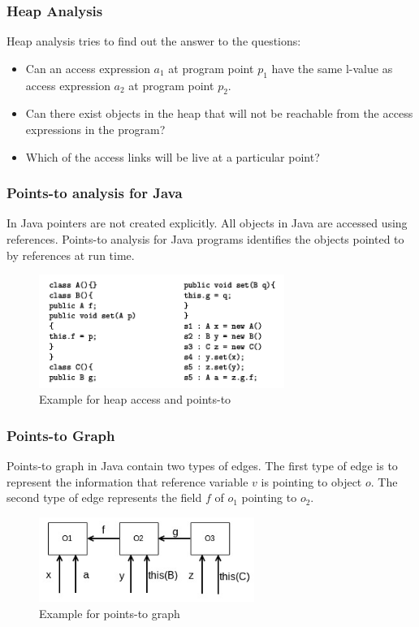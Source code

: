 \documentclass{beamer}
\begin{document}
  
  
  
  \begin{frame}
  \frametitle{Heap Analysis}
	Heap analysis tries to find out the answer to the questions: 
	\begin{itemize}
		\item Can an access expression $a_1$ at program point $p_1$ have the same l-value as access expression $a_2$ at program  point $p_2$.
		\item Can there exist objects in the heap that will not be reachable from the access expressions in the program?
		\item Which of the access links will be live at a particular point?
	\end{itemize}
	\end{frame}
\begin{frame}
\frametitle{Points-to analysis for Java}
	In Java pointers are not created explicitly. All objects in Java are accessed using references. Points-to analysis for Java programs identifies the objects pointed to by references at run time.
	
	\begin{figure}[here]
	\begin{center}
	\includegraphics[width=8cm]{Figures/rsz_heap.png}
	\end{center}
	\caption{Example for heap access and points-to}
	\label{fig:ex1}
	\end{figure}
	
	
	
  \end{frame}

  \begin{frame}
  \frametitle{Points-to Graph}
	Points-to graph in Java contain two types of edges. The first type of edge is to represent the information that reference variable $v$  is pointing to object $o$. The second type of edge represents the field $f$ of $o_1$ pointing to $o_2$.

	\begin{figure}[here]
		\begin{center}
			\includegraphics[width=7cm]{Figures/rsz_points_to_graph.png}
		\end{center}
		\caption{Example for points-to graph}
		\label{fig:ex1}
	\end{figure}

  \end{frame}
\end{document}
